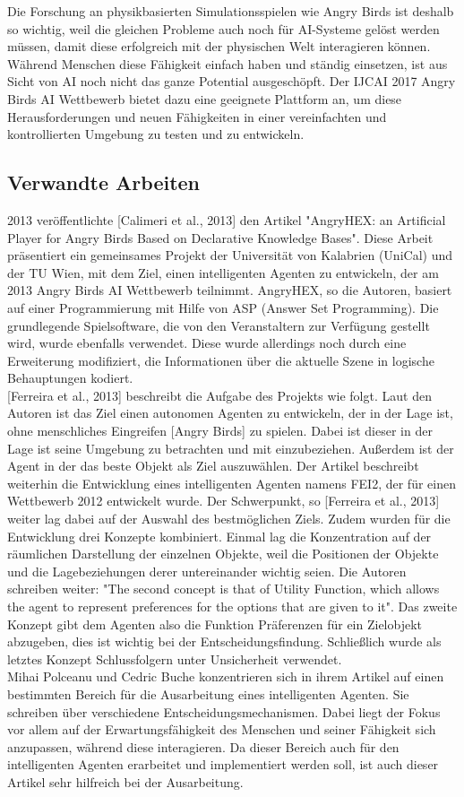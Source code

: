 Die Forschung an physikbasierten Simulationsspielen wie Angry Birds ist deshalb so wichtig, weil die gleichen Probleme auch noch für AI-Systeme gelöst werden müssen, damit diese erfolgreich mit der physischen Welt interagieren können. Während Menschen diese Fähigkeit einfach haben und ständig einsetzen, ist aus Sicht von AI noch nicht das ganze Potential ausgeschöpft. Der IJCAI 2017 Angry Birds AI Wettbewerb bietet dazu eine geeignete Plattform an, um diese Herausforderungen und neuen Fähigkeiten in einer vereinfachten und kontrollierten Umgebung zu testen und zu entwickeln.

\subsection{Verwandte Arbeiten}
2013 veröffentlichte [Calimeri et al., 2013] den Artikel "AngryHEX: an Artificial Player for Angry Birds Based on Declarative Knowledge Bases". Diese Arbeit präsentiert ein gemeinsames Projekt der Universität von Kalabrien (UniCal) und der TU Wien, mit dem Ziel, einen intelligenten Agenten zu entwickeln, der am 2013 Angry Birds AI Wettbewerb teilnimmt. AngryHEX, so die Autoren, basiert auf einer Programmierung mit Hilfe von ASP (Answer Set Programming). Die grundlegende Spielsoftware, die von den Veranstaltern zur Verfügung gestellt wird, wurde ebenfalls verwendet. Diese wurde allerdings noch durch eine Erweiterung modifiziert, die Informationen über die aktuelle Szene in logische Behauptungen kodiert.\\
{[Ferreira et al., 2013]} beschreibt die Aufgabe des Projekts wie folgt. Laut den Autoren ist das Ziel einen autonomen Agenten zu entwickeln, der in der Lage ist, ohne menschliches Eingreifen [Angry Birds] zu spielen. Dabei ist dieser in der Lage ist seine Umgebung zu betrachten und mit einzubeziehen. Außerdem ist der Agent in der das beste Objekt als Ziel auszuwählen. Der Artikel beschreibt weiterhin die Entwicklung eines intelligenten Agenten namens FEI2, der für einen Wettbewerb 2012 entwickelt wurde. Der Schwerpunkt, so [Ferreira et al., 2013] weiter lag dabei auf der Auswahl des bestmöglichen Ziels. Zudem wurden für die Entwicklung drei Konzepte kombiniert. Einmal lag die Konzentration auf der räumlichen Darstellung der einzelnen Objekte, weil die Positionen der Objekte und die Lagebeziehungen derer untereinander wichtig seien. Die Autoren schreiben weiter: "The second concept is that of Utility Function, which allows the agent to represent preferences for the options that are given to it". Das zweite Konzept gibt dem Agenten also die Funktion Präferenzen für ein Zielobjekt abzugeben, dies ist wichtig bei der Entscheidungsfindung. Schließlich wurde als letztes Konzept Schlussfolgern unter Unsicherheit verwendet.\\
Mihai Polceanu und Cedric Buche konzentrieren sich in ihrem Artikel auf einen bestimmten Bereich für die Ausarbeitung eines intelligenten Agenten. Sie schreiben über verschiedene Entscheidungsmechanismen. Dabei liegt der Fokus vor allem auf der Erwartungsfähigkeit des Menschen und seiner Fähigkeit sich anzupassen, während diese interagieren. Da dieser Bereich auch für den intelligenten Agenten erarbeitet und implementiert werden soll, ist auch dieser Artikel sehr hilfreich bei der Ausarbeitung.

